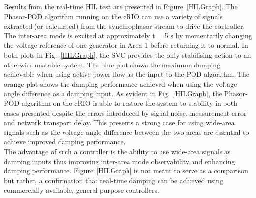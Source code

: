 \documentclass[a4paper, 10 pt, conference]{IEEEtran}
\begin{document}
Results from the real-time HIL test are presented in Figure~\ref{HILGraph}. The Phasor-POD algorithm running on the cRIO can use a variety of signals extracted (or calculated) from the synchrophasor stream to drive the controller. The inter-area mode is excited at approximately t = 5 s by momentarily changing the voltage reference of one generator in Area 1 before returning it to normal. In both plots in Fig.~\ref{HILGraph}, the SVC provides the only stabilising action to an otherwise unstable \cite{KundurTwoArea} system. The blue plot shows the maximum damping achievable when using active power flow as the input to the POD algorithm. The orange plot shows the damping performance achieved when using the voltage angle difference as a damping input. As evident in Fig.~\ref{HILGraph}, the Phasor-POD algorithm on the cRIO is able to restore the system to stability in both cases presented despite the errors introduced by signal noise, measurement error and network transport delay. This presents a strong case for using wide-area signals such as the voltage angle difference between the two areas are essential to achieve improved damping performance.\\

The advantage of such a controller is the ability to use wide-area signals as damping inputs thus improving inter-area mode observability and enhancing damping performance. Figure~\ref{HILGraph} is not meant to serve as a comparison but rather, a confirmation that real-time damping can be achieved using commercially available, general purpose controllers.\\
\end{document}
